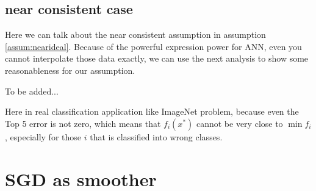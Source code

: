 \subsection{near consistent case}
Here we can talk about the near consistent assumption in assumption \ref{assum:nearideal}. Because of the powerful expression power for ANN, even you cannot interpolate those data exactly, we can use the next analysis to show some reasonableness for our assumption. 

To be added...



Here in real classification application like ImageNet problem, because even the Top 5 error is not zero, which means that $f_i(x^*)$ cannot be very close to $\min f_i$, especially for those $i$ that is classified into wrong classes.


\section{SGD as smoother}

